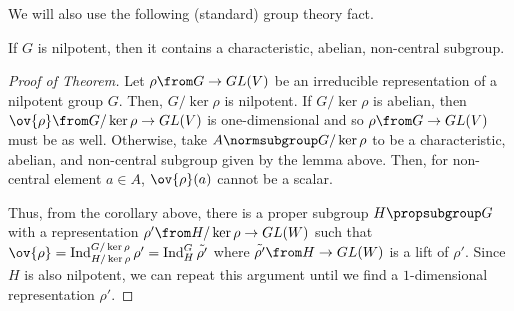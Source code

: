 \documentclass[11pt,leqno,oneside]{amsbook}
\newcommand{\Ind}{\operatorname{Ind}}
\numberwithin{thm}{section}
\begin{document}
We will also use the following (standard) group theory fact.
\begin{lem}
  If \(G\) is nilpotent, then it contains a characteristic, abelian, non-central
  subgroup.
\end{lem}
\begin{proof}[Proof of Theorem]
Let \(\rho \from G \to GL(V)\) be an irreducible representation of a
nilpotent group \(G\). Then, \(G/\ker \rho\) is nilpotent. If \(G/\ker
\rho\) is abelian, then \(\ov{\rho} \from G/\ker \rho \to GL(V)\) is
one-dimensional and so \(\rho \from G \to GL(V)\) must be as
well. Otherwise, take \(A \normsubgroup G/\ker \rho\) to be a
characteristic, abelian, and non-central subgroup given by the lemma
above. Then, for non-central element \(a \in A\), \(\ov{\rho}(a)\)
cannot be a scalar.

Thus, from the corollary above, there is a proper subgroup \(H
\propsubgroup G\) with a representation \(\rho' \from H/\ker \rho \to
GL(W)\) such that \(\ov{\rho} = \Ind_{H/\ker \rho}^{G/\ker \rho} \rho'
= \Ind_H^G \tilde{\rho'}\) where \(\tilde{\rho'} \from H \to GL(W)\)
is a lift of \(\rho'\). Since \(H\) is also nilpotent, we can repeat
this argument until we find a \(1\)-dimensional representation \(\rho'\).
\end{proof}
\end{document}
